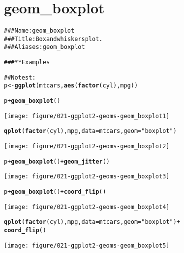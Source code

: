 \documentclass[a4paper,titlepage]{tufte-handout}\usepackage{graphicx, color}
\makeatletter
\def\maxwidth{ %
  \ifdim\Gin@nat@width>\linewidth
    \linewidth
  \else
    \Gin@nat@width
  \fi
}
\newcommand{\hlfunctioncall}[1]{\textcolor[rgb]{0.501960784313725,0,0.329411764705882}{\textbf{#1}}}%
\newcommand{\hlstring}[1]{\textcolor[rgb]{0.6,0.6,1}{#1}}%
\newcommand{\hlcomment}[1]{\textcolor[rgb]{0.180392156862745,0.6,0.341176470588235}{#1}}%
\newenvironment{kframe}{%
 \def\at@end@of@kframe{}%
 \ifinner\ifhmode%
  \def\at@end@of@kframe{\end{minipage}}%
  \begin{minipage}{\columnwidth}%
 \fi\fi%
 \def\FrameCommand##1{\hskip\@totalleftmargin \hskip-\fboxsep
 \colorbox{shadecolor}{##1}\hskip-\fboxsep
     \hskip-\linewidth \hskip-\@totalleftmargin \hskip\columnwidth}%
 \MakeFramed {\advance\hsize-\width
   \@totalleftmargin\z@ \linewidth\hsize
   \@setminipage}}%
 {\par\unskip\endMakeFramed%
 \at@end@of@kframe}
\newenvironment{knitrout}{}{} %
\makeatother
\begin{document}
\section{geom\_boxplot}

\begin{knitrout}
\color{fgcolor}\begin{kframe}
\begin{alltt}
\hlcomment{### Name: geom_boxplot}
\hlcomment{### Title: Box and whiskers plot.}
\hlcomment{### Aliases: geom_boxplot}

\hlcomment{### ** Examples}

\hlcomment{## No test: }
p <- \hlfunctioncall{ggplot}(mtcars, \hlfunctioncall{aes}(\hlfunctioncall{factor}(cyl), mpg))

p + \hlfunctioncall{geom_boxplot}()
\end{alltt}
\end{kframe}
\texttt{[image: figure/021-ggplot2-geoms-geom\_boxplot1]} 
\begin{kframe}\begin{alltt}
\hlfunctioncall{qplot}(\hlfunctioncall{factor}(cyl), mpg, data = mtcars, geom = \hlstring{"boxplot"})
\end{alltt}
\end{kframe}
\texttt{[image: figure/021-ggplot2-geoms-geom\_boxplot2]} 
\begin{kframe}\begin{alltt}

p + \hlfunctioncall{geom_boxplot}() + \hlfunctioncall{geom_jitter}()
\end{alltt}
\end{kframe}
\texttt{[image: figure/021-ggplot2-geoms-geom\_boxplot3]} 
\begin{kframe}\begin{alltt}
p + \hlfunctioncall{geom_boxplot}() + \hlfunctioncall{coord_flip}()
\end{alltt}
\end{kframe}
\texttt{[image: figure/021-ggplot2-geoms-geom\_boxplot4]} 
\begin{kframe}\begin{alltt}
\hlfunctioncall{qplot}(\hlfunctioncall{factor}(cyl), mpg, data = mtcars, geom = \hlstring{"boxplot"}) +
  \hlfunctioncall{coord_flip}()
\end{alltt}
\end{kframe}
\texttt{[image: figure/021-ggplot2-geoms-geom\_boxplot5]} 
\begin{kframe}\begin{alltt}


\end{alltt}
\end{kframe}
\end{knitrout}
\end{document}
